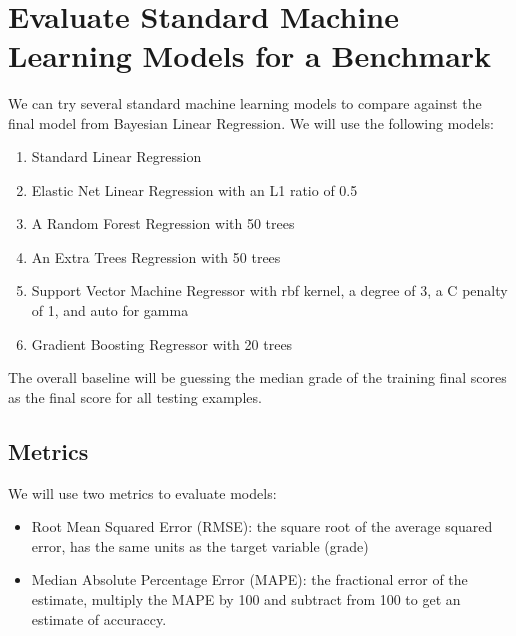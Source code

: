 \documentclass[12pt]{article}
\providecommand{\tightlist}{%
      \setlength{\itemsep}{0pt}\setlength{\parskip}{0pt}}
\begin{document}
    \begin{center}
    \end{center}
    { \hspace*{\fill} \\}
    
    \hypertarget{evaluate-standard-machine-learning-models-for-a-benchmark}{%
\section{Evaluate Standard Machine Learning Models for a
Benchmark}\label{evaluate-standard-machine-learning-models-for-a-benchmark}}

We can try several standard machine learning models to compare against
the final model from Bayesian Linear Regression. We will use the
following models:

\begin{enumerate}
\def\labelenumi{\arabic{enumi}.}
\tightlist
\item
  Standard Linear Regression
\item
  Elastic Net Linear Regression with an L1 ratio of 0.5
\item
  A Random Forest Regression with 50 trees
\item
  An Extra Trees Regression with 50 trees
\item
  Support Vector Machine Regressor with rbf kernel, a degree of 3, a C
  penalty of 1, and auto for gamma
\item
  Gradient Boosting Regressor with 20 trees
\end{enumerate}

The overall baseline will be guessing the median grade of the training
final scores as the final score for all testing examples.

\hypertarget{metrics}{%
\subsection{Metrics}\label{metrics}}

We will use two metrics to evaluate models:

\begin{itemize}
\tightlist
\item
  Root Mean Squared Error (RMSE): the square root of the average squared
  error, has the same units as the target variable (grade)
\item
  Median Absolute Percentage Error (MAPE): the fractional error of the
  estimate, multiply the MAPE by 100 and subtract from 100 to get an
  estimate of accuraccy.
\end{itemize}
\end{document}
